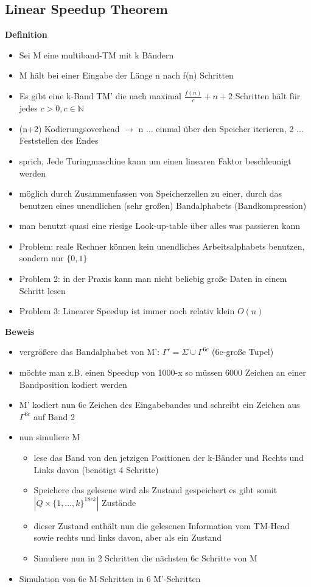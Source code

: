 \documentclass[12pt,a4paper]{article}
\begin{document}
\subsection{Linear Speedup Theorem}
\textbf{Definition}\\
\begin{itemize}
\item Sei M eine multiband-TM mit k Bändern
\item M hält bei einer Eingabe der Länge n nach f(n) Schritten
\item Es gibt eine k-Band TM' die nach maximal  $\frac{f(n)}{c} +n + 2$ Schritten hält für jedes $c > 0, c\in \mathbb{N}$
\item (n+2) Kodierungsoverhead $\rightarrow$ n ... einmal über den Speicher iterieren, 2 ... Feststellen des Endes
\item sprich, Jede Turingmaschine kann um einen linearen Faktor beschleunigt werden
\item möglich durch Zusammenfassen von Speicherzellen zu einer, durch das benutzen eines unendlichen (sehr großen) Bandalphabets (Bandkompression)
\item man benutzt quasi eine riesige Look-up-table über alles was passieren kann
\item Problem: reale Rechner können kein unendliches Arbeitsalphabets benutzen, sondern nur $\{0, 1\}$
\item Problem 2: in der Praxis kann man nicht beliebig große Daten in einem Schritt lesen
\item Problem 3: Linearer Speedup ist immer noch relativ klein $O(n)$
\end{itemize}
\textbf{Beweis}\\
\begin{itemize}
\item vergrößere das Bandalphabet von M': $\Gamma ' = \Sigma \cup \Gamma^{6c}$ (6c-große Tupel)
\item möchte man z.B. einen Speedup von 1000-x so müssen 6000 Zeichen an einer Bandposition kodiert werden
\item M' kodiert nun 6c Zeichen des Eingabebandes und schreibt ein Zeichen aus $\Gamma^{6c}$ auf Band 2
\item nun simuliere M
\begin{itemize}
\item lese das Band von den jetzigen Positionen der k-Bänder und Rechts und Links davon (benötigt 4 Schritte)
\item Speichere das gelesene wird als Zustand gespeichert es gibt somit $|Q \times \{1,...,k\}^{18ck}|$ Zustände
\item dieser Zustand enthält nun die gelesenen Information vom TM-Head sowie rechts und links davon, aber als ein Zustand
\item Simuliere nun in 2 Schritten die nächsten 6c Schritte von M
\end{itemize}
\item Simulation von 6c M-Schritten in 6 M'-Schritten
\end{itemize}
\end{document}
